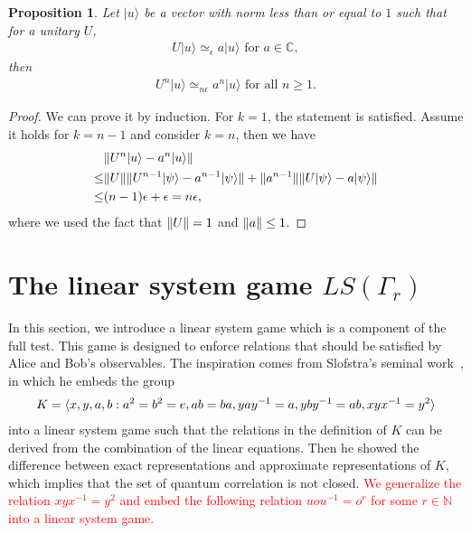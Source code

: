 \documentclass[11pt,letterpaper]{article}
\newcommand{\ket}[1]{|#1\rangle}
\DeclarePairedDelimiter{\norm}{\lVert}{\rVert}
\DeclarePairedDelimiter{\ip}{\langle}{\rangle}
\newcommand{\C}{\mathbb{C}}
\newcommand{\N}{\mathbb{N}}
\newcommand{\1}{\mathbb{1}}
\newcommand{\LS}{LS}
\newcommand{\ep}{\epsilon}
\newcommand{\appd}[1]{\simeq_{#1}}
\newcommand{\hf}[1]{\textcolor{red}{#1}}
\newtheorem{proposition}[theorem]{Proposition}
\theoremstyle{definition}
\begin{document}
\begin{proposition}
	Let $\ket{u}$ be a vector with norm less than or equal to $1$ such that for a unitary $U$,
	\begin{align*}
		U\ket{u} \appd{\ep} a\ket{u} \text{ for } a \in \C,
	\end{align*}
	then
	\begin{align*}
		U^n \ket{u} \appd{n\ep} a^n \ket{u} \text{ for all } n \geq 1.
	\end{align*}
\end{proposition}
\begin{proof}
	We can prove it by induction. 
	For $k=1$, the statement is satisfied.
	Assume it holds for $k = n-1$ and consider $k = n$, then we have
	\begin{align*}
		&\norm{U^n \ket{u} - a^n\ket{u}} \\
		\leq &\norm{U} \norm{U^{n-1} \ket{\psi} - a^{n-1}\ket{\psi}} + \norm{a^{n-1}}
		\norm{U\ket{\psi} - a \ket{\psi}}\\
		\leq &(n-1)\ep + \ep = n \ep,
	\end{align*}
	where we used the fact that $\norm{U} = 1$ and $\norm{a} \leq 1$.
\end{proof}

\section{The linear system game $\LS(\Gamma_r)$}
\label{sec:lsg}
In this section, we introduce a linear system game which is a component of the full test.
This game is designed to enforce relations that should be satisfied by 
Alice and Bob's observables. The inspiration comes from 
Slofstra's seminal work~\cite{slofstra2017}, in which he
embeds the group
\begin{align}
	K = \ip{ x,y,a,b:a^2=b^2=e, ab=ba, yay^{-1} = a, yby^{-1} = ab, xyx^{-1}=y^2}
\end{align}
into a linear system game such that the relations in the definition of $K$ can be derived from the
combination of the linear equations. Then he showed the difference between exact representations
and approximate representations of $K$, which implies that the set of quantum correlation is not closed.
\hf{We generalize the relation $xyx^{-1} = y^2$ and embed the 
following relation
$
uou^{-1} = o^r 
$
for some $r \in \N$ into a linear system game.}

\end{document}
